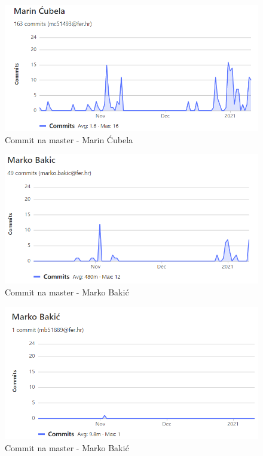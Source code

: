 		\begin{figure}[H]
			\includegraphics[width=1\linewidth]{images/mc-git.png}
			\caption{Commit na master - Marin Ćubela}
			\label{fig:Marin Ćubela - git} 
		\end{figure}
		
		\begin{figure}[H]
			\includegraphics[width=1\linewidth]{images/mb-git2.png}
			\caption{Commit na master - Marko Bakić}
			\label{fig:Marko Bakić - git2} 
		\end{figure}
	
		\begin{figure}[H]
			\includegraphics[width=1\linewidth]{images/mb-git1.png}
			\caption{Commit na master - Marko Bakić}
			\label{fig:Marko Bakić - git} 
		\end{figure}

